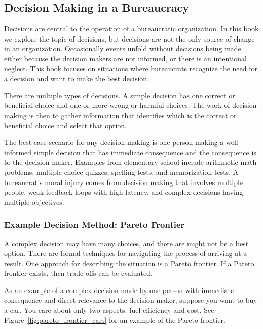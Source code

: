 \subsection*{Decision Making in a Bureaucracy\label{sec:decision-making}}

Decisions are central to the operation of a bureaucratic organization. In this book we explore the topic of decisions, but decisions are not the only source of change in an organization. Occasionally events unfold without decisions being made either because the decision makers are not informed, or there is an \href{https://en.wikipedia.org/wiki/Willful_blindness}{intentional neglect}. This book focuses on situations where bureaucrats recognize the need for a decision and want to make the best decision.

There are multiple types of decisions. 
A \gls{simple decision} has one correct or beneficial choice and one or more wrong or harmful choices. The work of decision making is then to gather information that identifies which is the correct or beneficial choice and select that option.

The best case scenario for any decision making is one person making a well-informed simple decision that has immediate consequence and the consequence is to the decision maker. Examples from elementary school include arithmetic math problems, multiple choice quizzes, spelling tests, and memorization tests. A bureaucrat's \href{https://en.wikipedia.org/wiki/Moral_injury}{moral injury} comes from decision making that involves multiple people, weak feedback loops with high latency, and complex decisions having multiple objectives.

\subsubsection{Example Decision Method: Pareto Frontier\label{sec:pareto}}

A complex decision may have many choices, and there are might not be a best option. There are formal techniques for navigating the process of arriving at a result. One approach for describing the situation is a \href{https://en.wikipedia.org/wiki/Pareto_front}{Pareto frontier}. If a Pareto frontier exists, then trade-offs can be evaluated. 

As an example of a complex decision made by one person with immediate consequence and direct relevance to the decision maker, suppose you want to buy a car. You care about only two aspects: fuel efficiency and cost. See Figure~\ref{fig:pareto_frontier_cars} for an example of the Pareto frontier.

